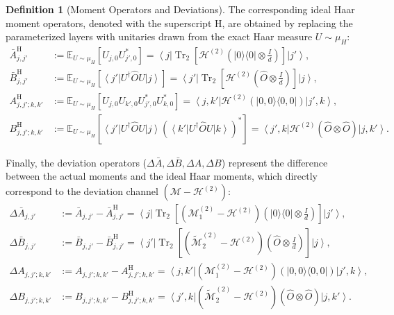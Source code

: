 \documentclass[%
 reprint,
 amsmath,amssymb,
 aps,
 pra,
]{revtex4-2}
\theoremstyle{definition}
\newtheorem{definition}[theorem]{Definition}
\begin{document}
\begin{definition}[Moment Operators and Deviations]
The corresponding ideal Haar moment operators, denoted with the superscript $\mathrm{H}$, are obtained by replacing the parameterized layers with unitaries drawn from the exact Haar measure $U \sim \mu_H$:
\begin{align}
\bar A^{\mathrm H}_{j,j'}
&:=
\mathbb{E}_{U\sim\mu_H} \left[ U_{j,0}U_{j',0}^* \right]
=
\left\langle j\right| \operatorname{Tr}_2 \left[ \mathcal{H}^{(2)} \left( |0\rangle\langle0|\otimes\frac{I}{d} \right) \right] \left|j'\right\rangle, \\
\bar B^{\mathrm H}_{j,j'}
&:=
\mathbb{E}_{U\sim\mu_H} \left[ \left\langle j'\right| U^\dagger\hat O U \left|j\right\rangle \right]
=
\left\langle j'\right| \operatorname{Tr}_2 \left[ \mathcal{H}^{(2)} \left( \hat O\otimes\frac{I}{d} \right) \right] \left|j\right\rangle, \\
A^{\mathrm H}_{j,j';k,k'}
&:=
\mathbb{E}_{U\sim\mu_H} \left[ U_{j,0} U_{k',0} U^*_{j',0} U^*_{k,0} \right]
=
\left\langle j,k'\right| \mathcal H^{(2)} \left( |0,0\rangle\langle0,0| \right) \left|j',k\right\rangle, \\
B^{\mathrm H}_{j,j';k,k'}
&:=
\mathbb{E}_{U\sim\mu_H} \left[ \left\langle j'\right| U^\dagger\hat O U \left|j\right\rangle \left( \left\langle k'\right| U^\dagger\hat O U \left|k\right\rangle \right)^* \right]
=
\left\langle j',k\right| \mathcal H^{(2)} \left( \hat O\otimes\hat O \right) \left|j,k'\right\rangle.
\end{align}

Finally, the deviation operators ($\Delta\bar A, \Delta\bar B, \Delta A, \Delta B$) represent the difference between the actual moments and the ideal Haar moments, which directly correspond to the deviation channel $(\mathcal{M} - \mathcal{H}^{(2)})$:
\begin{align}
\Delta\bar A_{j,j'}
&:=
\bar A_{j,j'} - \bar A^{\mathrm H}_{j,j'}
=
\left\langle j\right| \operatorname{Tr}_2 \left[ \left( \mathcal M^{(2)}_1-\mathcal H^{(2)} \right) \left( |0\rangle\langle0|\otimes\frac{I}{d} \right) \right] \left|j'\right\rangle, \\
\Delta\bar B_{j,j'}
&:=
\bar B_{j,j'} - \bar B^{\mathrm H}_{j,j'}
=
\left\langle j'\right| \operatorname{Tr}_2 \left[ \left( \widetilde{\mathcal M}^{(2)}_2-\mathcal H^{(2)} \right) \left( \hat O\otimes\frac{I}{d} \right) \right] \left|j\right\rangle, \\
\Delta A_{j,j';k,k'}
&:=
A_{j,j';k,k'} - A^{\mathrm H}_{j,j';k,k'}
=
\left\langle j,k'\right| \left( \mathcal M^{(2)}_1-\mathcal H^{(2)} \right) \left( |0,0\rangle\langle0,0| \right) \left|j',k\right\rangle, \\
\Delta B_{j,j';k,k'}
&:=
B_{j,j';k,k'} - B^{\mathrm H}_{j,j';k,k'}
=
\left\langle j',k\right| \left( \widetilde{\mathcal M}^{(2)}_2-\mathcal H^{(2)} \right) \left( \hat O\otimes\hat O \right) \left|j,k'\right\rangle.
\end{align}
\end{definition}
\end{document}
